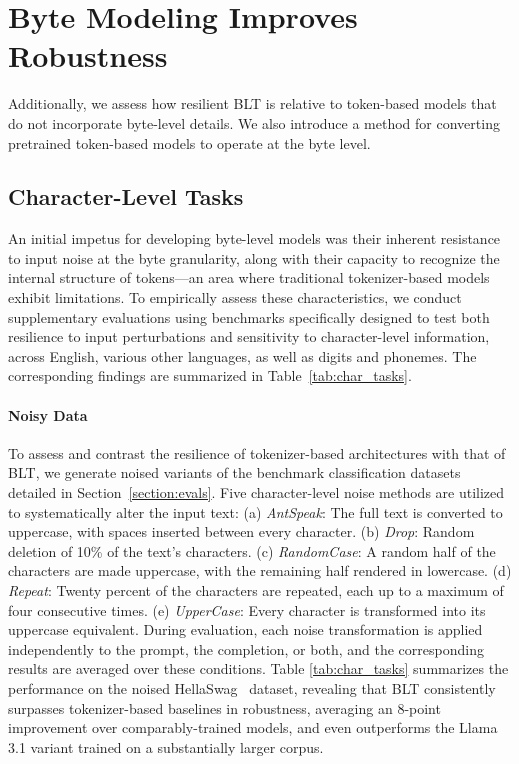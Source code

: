 \section{Byte Modeling Improves Robustness} Additionally, we assess how resilient {\textsc BLT} is relative to token-based models that do not incorporate byte-level details. We also introduce a method for converting pretrained token-based models to operate at the byte level.
\label{sec:robustness}

\subsection{Character-Level Tasks}

An initial impetus for developing byte-level models was their inherent resistance to input noise at the byte granularity, along with their capacity to recognize the internal structure of tokens—an area where traditional tokenizer-based models exhibit limitations. To empirically assess these characteristics, we conduct supplementary evaluations using benchmarks specifically designed to test both resilience to input perturbations and sensitivity to character-level information, across English, various other languages, as well as digits and phonemes. The corresponding findings are summarized in Table~\ref{tab:char_tasks}.

\paragraph{Noisy Data} To assess and contrast the resilience of tokenizer-based architectures with that of {\textsc BLT}, we generate noised variants of the benchmark classification datasets detailed in Section~\ref{section:evals}. Five character-level noise methods are utilized to systematically alter the input text: (a) \textit{AntSpeak}: The full text is converted to uppercase, with spaces inserted between every character. (b) \textit{Drop}: Random deletion of 10\% of the text's characters. (c) \textit{RandomCase}: A random half of the characters are made uppercase, with the remaining half rendered in lowercase. (d) \textit{Repeat}: Twenty percent of the characters are repeated, each up to a maximum of four consecutive times. (e) \textit{UpperCase}: Every character is transformed into its uppercase equivalent. During evaluation, each noise transformation is applied independently to the prompt, the completion, or both, and the corresponding results are averaged over these conditions. Table \ref{tab:char_tasks} summarizes the performance on the noised HellaSwag~\citep{Eval_hellaswag} dataset, revealing that {\textsc BLT} consistently surpasses tokenizer-based baselines in robustness, averaging an 8-point improvement over comparably-trained models, and even outperforms the Llama 3.1 variant trained on a substantially larger corpus.

